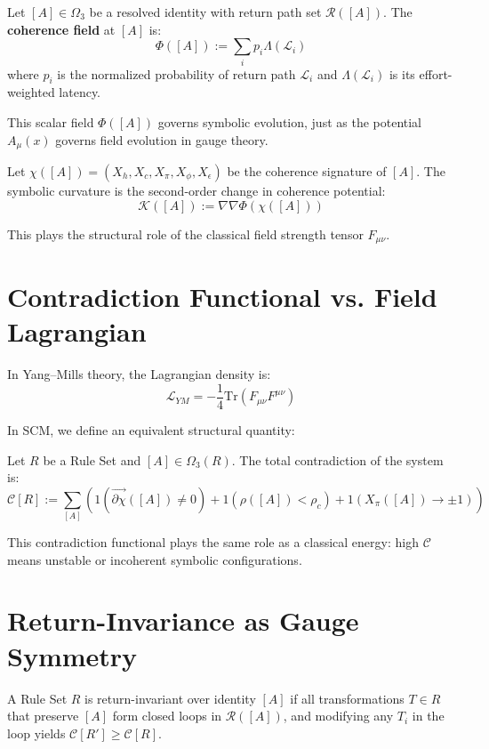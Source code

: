 \begin{definition}
Let $[A] \in \Omega_3$ be a resolved identity with return path set $\mathcal{R}([A])$. The \textbf{coherence field} at $[A]$ is:
\[
\Phi([A]) := \sum_{i} p_i \Lambda(\mathcal{L}_i)
\]
where $p_i$ is the normalized probability of return path $\mathcal{L}_i$ and $\Lambda(\mathcal{L}_i)$ is its effort-weighted latency.
\end{definition}

This scalar field $\Phi([A])$ governs symbolic evolution, just as the potential $A_\mu(x)$ governs field evolution in gauge theory.

\begin{definition}
Let $\chi([A]) = (X_h, X_c, X_\pi, X_\phi, X_\epsilon)$ be the coherence signature of $[A]$. The symbolic curvature is the second-order change in coherence potential:
\[
\mathcal{K}([A]) := \nabla \nabla \Phi(\chi([A]))
\]
\end{definition}

This plays the structural role of the classical field strength tensor $F_{\mu\nu}$.

\section{Contradiction Functional vs. Field Lagrangian}

In Yang--Mills theory, the Lagrangian density is:
\[
\mathcal{L}_{YM} = -\frac{1}{4} \text{Tr}(F_{\mu\nu} F^{\mu\nu})
\]

In SCM, we define an equivalent structural quantity:

\begin{definition}
Let $R$ be a Rule Set and $[A] \in \Omega_3(R)$. The total contradiction of the system is:
\[
\mathcal{C}[R] := \sum_{[A]} \left( 1(\vec{\partial \chi}([A]) \neq 0) + 1(\rho([A]) < \rho_c) + 1(X_\pi([A]) \to \pm 1) \right)
\]
\end{definition}

This contradiction functional plays the same role as a classical energy: high $\mathcal{C}$ means unstable or incoherent symbolic configurations.

\section{Return-Invariance as Gauge Symmetry}

\begin{definition}
A Rule Set $R$ is return-invariant over identity $[A]$ if all transformations $T \in R$ that preserve $[A]$ form closed loops in $\mathcal{R}([A])$, and modifying any $T_i$ in the loop yields $\mathcal{C}[R'] \geq \mathcal{C}[R]$.
\end{definition}

